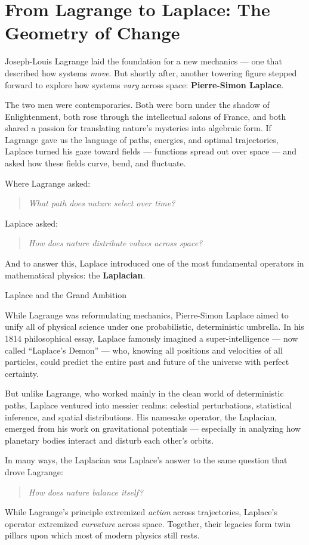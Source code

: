 \section{From Lagrange to Laplace: The Geometry of Change}

Joseph-Louis Lagrange laid the foundation for a new mechanics — one that described how systems \emph{move}. But shortly after, another towering figure stepped forward to explore how systems \emph{vary} across space: \textbf{Pierre-Simon Laplace}.

The two men were contemporaries. Both were born under the shadow of Enlightenment, both rose through the intellectual salons of France, and both shared a passion for translating nature’s mysteries into algebraic form. If Lagrange gave us the language of paths, energies, and optimal trajectories, Laplace turned his gaze toward fields — functions spread out over space — and asked how these fields curve, bend, and fluctuate.

Where Lagrange asked:  
\begin{quote}
    \emph{What path does nature select over time?}
\end{quote}
Laplace asked:  
\begin{quote}
    \emph{How does nature distribute values across space?}
\end{quote}

And to answer this, Laplace introduced one of the most fundamental operators in mathematical physics: the \textbf{Laplacian}.

\begin{HistoricalSidebar}{Laplace and the Grand Ambition}

While Lagrange was reformulating mechanics, Pierre-Simon Laplace aimed to unify all of physical science under one 
probabilistic, deterministic umbrella. In his 1814 philosophical essay, Laplace famously imagined a super-intelligence 
— now called “Laplace’s Demon” — who, knowing all positions and velocities of all particles, could predict the 
entire past and future of the universe with perfect certainty.

But unlike Lagrange, who worked mainly in the clean world of deterministic paths, Laplace ventured into messier 
realms: celestial perturbations, statistical inference, and spatial distributions. His namesake operator, the 
Laplacian, emerged from his work on gravitational potentials — especially in analyzing how planetary bodies interact 
and disturb each other's orbits.

In many ways, the Laplacian was Laplace’s answer to the same question that drove Lagrange:  

\begin{quote}
    \emph{How does nature balance itself?}
\end{quote}

While Lagrange’s principle extremized \emph{action} across trajectories, Laplace’s operator extremized \emph{curvature} across space. Together, their legacies form twin pillars upon which most of modern physics still rests.

\end{HistoricalSidebar}


